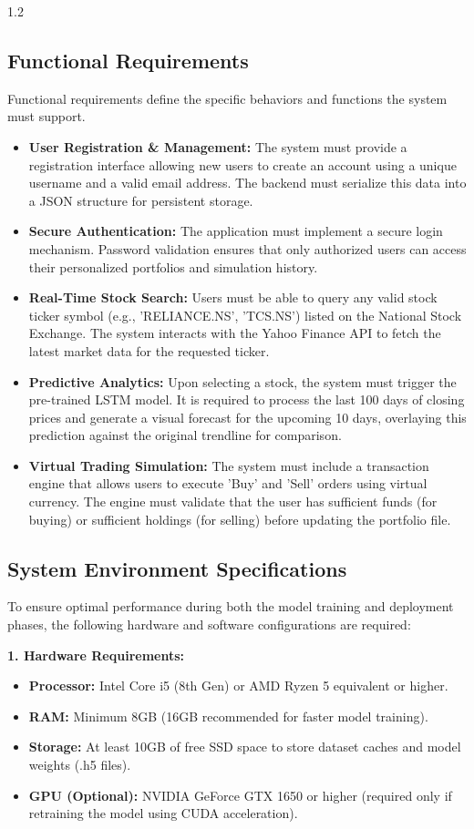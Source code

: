 \documentclass[12pt, a4paper]{report}
\begin{document}
\begin{spacing}{1.2}
\subsection{Functional Requirements} Functional requirements define the specific behaviors and functions the system must support. \begin{itemize} \item \textbf{User Registration \& Management:} The system must provide a registration interface allowing new users to create an account using a unique username and a valid email address. The backend must serialize this data into a JSON structure for persistent storage. \item \textbf{Secure Authentication:} The application must implement a secure login mechanism. Password validation ensures that only authorized users can access their personalized portfolios and simulation history. \item \textbf{Real-Time Stock Search:} Users must be able to query any valid stock ticker symbol (e.g., 'RELIANCE.NS', 'TCS.NS') listed on the National Stock Exchange. The system interacts with the Yahoo Finance API to fetch the latest market data for the requested ticker. \item \textbf{Predictive Analytics:} Upon selecting a stock, the system must trigger the pre-trained LSTM model. It is required to process the last 100 days of closing prices and generate a visual forecast for the upcoming 10 days, overlaying this prediction against the original trendline for comparison. \item \textbf{Virtual Trading Simulation:} The system must include a transaction engine that allows users to execute 'Buy' and 'Sell' orders using virtual currency. The engine must validate that the user has sufficient funds (for buying) or sufficient holdings (for selling) before updating the portfolio file. \end{itemize}

\subsection{System Environment Specifications} To ensure optimal performance during both the model training and deployment phases, the following hardware and software configurations are required:

\textbf{1. Hardware Requirements:} \begin{itemize} \item \textbf{Processor:} Intel Core i5 (8th Gen) or AMD Ryzen 5 equivalent or higher. \item \textbf{RAM:} Minimum 8GB (16GB recommended for faster model training). \item \textbf{Storage:} At least 10GB of free SSD space to store dataset caches and model weights (.h5 files). \item \textbf{GPU (Optional):} NVIDIA GeForce GTX 1650 or higher (required only if retraining the model using CUDA acceleration). \end{itemize}


\end{spacing}
\end{document}
